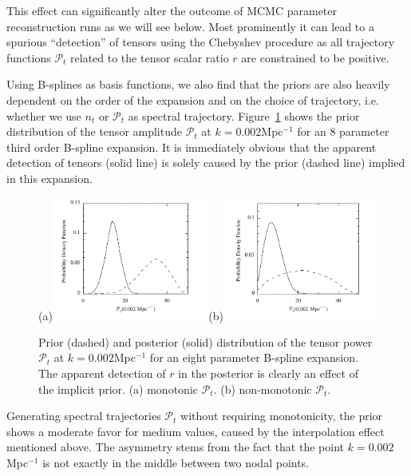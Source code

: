 \documentclass[a4paper,11pt]{article}
\newcommand{\ptensor}{{\mathcal{P}_t}}
\begin{document}
This effect can significantly alter the outcome of MCMC parameter
reconstruction runs as we will see below. Most prominently it can lead
to a spurious ``detection'' of tensors using the Chebyshev procedure
as all trajectory functions $\ptensor$ related to the
tensor scalar ratio $r$ are constrained to be positive.

Using B-splines as basis functions, we also find that the priors are
also heavily dependent on the order of the expansion and on the choice
of trajectory, i.e. whether we use $n_t$ or $\ptensor$ as
spectral trajectory. Figure~\ref{fig:prior_bspline} shows the prior
distribution of the tensor amplitude $\ptensor$ at
$k=0.002$Mpc$^{-1}$ for an $8$ parameter third order B-spline
expansion. It is immediately obvious that the apparent detection of
tensors (solid line) is solely caused by the prior (dashed line)
implied in this expansion.
\begin{figure}
  (a)\includegraphics[width=0.45\textwidth]{prior_posterior_monopt}
  (b)\includegraphics[width=0.45\textwidth]{prior_posterior_pt}
  \caption{Prior (dashed) and posterior (solid)
    distribution of the tensor power $\ptensor$ at
    $k=0.002$Mpc$^{-1}$ for an eight parameter B-spline expansion. The
    apparent detection of $r$ in the posterior is clearly an effect of
    the implicit prior. (a) monotonic $\ptensor$. (b)
    non-monotonic $\ptensor$.}
  \label{fig:prior_bspline}
\end{figure}
Generating spectral trajectories $\ptensor$ without requiring
monotonicity, the prior shows a moderate favor for medium values,
caused by the interpolation effect mentioned above. The asymmetry
stems from the fact that the point $k=0.002$Mpc$^{-1}$ is not exactly
in the middle between two nodal points.
\end{document}
